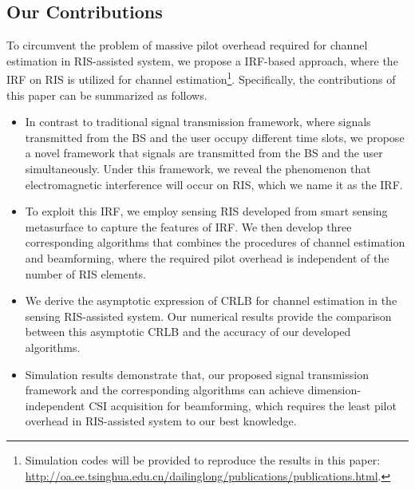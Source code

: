 \documentclass[12pt,draftclsnofoot,journal,onecolumn]{IEEEtran}
\theoremstyle{nonumberplain}
\begin{document}
\subsection{Our Contributions}
\label{Our Contributions}

To circumvent the problem of massive pilot overhead required for channel estimation in RIS-assisted system, we propose a \ac{IRF}-based approach, where the \ac{IRF} on RIS is utilized for channel estimation\footnote{Simulation codes will be provided to reproduce the results in this paper: \url{http://oa.ee.tsinghua.edu.cn/dailinglong/publications/publications.html}.}.
Specifically, the contributions of this paper can be summarized as follows.
    \begin{itemize}
        \item %
        In contrast to traditional signal transmission framework, where signals transmitted from the \ac{BS} and the user occupy different time slots, we propose a novel framework that signals are transmitted from the \ac{BS} and the user simultaneously.
        Under this framework, we reveal the phenomenon that electromagnetic interference will occur on RIS, which we name it as the \ac{IRF}.
        \item
        To exploit this \ac{IRF}, we employ sensing RIS developed from smart sensing metasurface to capture the features of \ac{IRF}.
        We then develop three corresponding algorithms that combines the procedures of channel estimation and beamforming, where the required pilot overhead is independent of the number of RIS elements.
        \item
        We derive the asymptotic expression of \ac{CRLB} for channel estimation in the sensing RIS-assisted system.
        Our numerical results provide the comparison between this asymptotic \ac{CRLB} and the accuracy of our developed algorithms.
        \item
        Simulation results demonstrate that, our proposed signal transmission framework and the corresponding algorithms can achieve dimension-independent CSI acquisition for beamforming, which requires the least pilot overhead in RIS-assisted system to our best knowledge.

\end{itemize}
\end{document}
